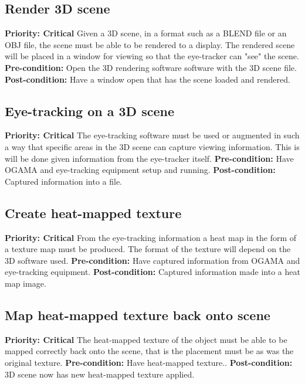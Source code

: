 \subsection{Render 3D scene}
    \textbf{Priority: Critical}\newline
    Given a 3D scene, in a format such as a BLEND file or an OBJ file, the scene must be able to be rendered to a display. The rendered scene will be placed in a window for viewing so that the eye-tracker can "see" the scene.\newline
    \textbf{Pre-condition: }
    Open the 3D rendering software software with the 3D scene file.\newline
    \textbf{Post-condition: }
    Have a window open that has the scene loaded and rendered.
    
\subsection{Eye-tracking on a 3D scene}
    \textbf{Priority: Critical}\newline
    The eye-tracking software must be used or augmented in such a way that specific areas in the 3D scene can capture viewing information. This is will be done given information from the eye-tracker itself.\newline
    \textbf{Pre-condition: }
    Have OGAMA and eye-tracking equipment setup and running.\newline
    \textbf{Post-condition: }
    Captured information into a file.
    
\subsection{Create heat-mapped texture}
    \textbf{Priority: Critical}\newline
    From the eye-tracking information a heat map in the form of a texture map must be produced. The format of the texture will depend on the 3D software used.\newline
    \textbf{Pre-condition: }
    Have captured information from OGAMA and eye-tracking equipment.\newline
    \textbf{Post-condition: }
    Captured information made into a heat map image.
    
\subsection{Map heat-mapped texture back onto scene}
    \textbf{Priority: Critical}\newline
    The heat-mapped texture of the object must be able to be mapped correctly back onto the scene, that is the placement must be as was the original texture.\newline
    \textbf{Pre-condition: }
    Have heat-mapped texture..\newline
    \textbf{Post-condition: }
    3D scene now has new heat-mapped texture applied.
    
